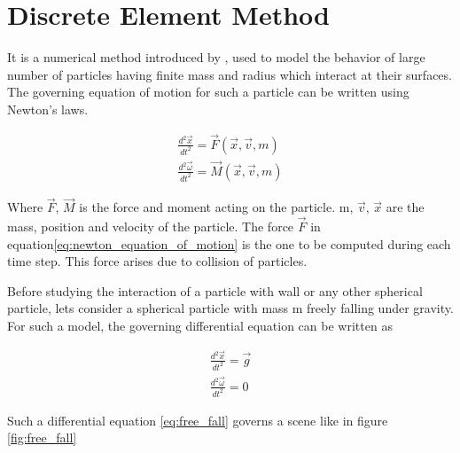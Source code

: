 \section{Discrete Element Method}

It is a numerical method introduced by \cite{Cundall_1979},
used to model the behavior of large number of particles having finite
mass and radius which interact at their surfaces. The governing
equation of motion for such a particle can be written using Newton's
laws.

\begin{align}
  \label{eq:newton_equation_of_motion}
  \frac{d^2 \vec{x}}{dt^2} = \vec{F}(\vec{x}, \vec{v}, m)\\
  \frac{d^2 \vec{\omega}}{dt^2} = \vec{M}(\vec{x}, \vec{v}, m)
\end{align}

Where $\vec{F}$, $\vec{M}$ is the force and moment acting on the
particle. m, $\vec{v}$, $\vec{x}$ are the mass, position and velocity
of the particle.
The force $\vec{F}$ in equation\ref{eq:newton_equation_of_motion} is
the one to be computed during each time step. This force arises due to
collision of particles.


Before studying the interaction of a particle with wall or any other
spherical particle, lets consider a spherical particle with mass m
freely falling under gravity. For such a model, the governing
differential equation can be written as

\begin{align}
  \label{eq:free_fall}
  \frac{d^2 \vec{x}}{dt^2} = \vec{g}\\
  \frac{d^2 \vec{\omega}}{dt^2} = 0
\end{align}

Such a differential equation \eqref{eq:free_fall} governs a scene like
in figure \eqref{fig:free_fall}

